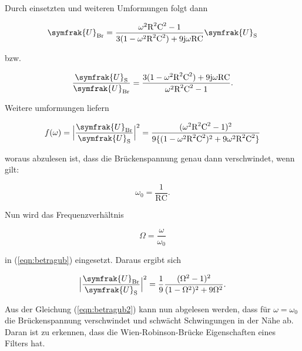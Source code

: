 \noindent
Durch einsetzten und weiteren Umformungen folgt dann

\begin{equation}
\symfrak{U}_\text{Br} = \frac{\omega^2 \text{R}^2 \text{C}^2 - 1}{3 (1 - \omega^2 \text{R}^2 \text{C}^2) + 9 \text{j} \omega \text{R} \text{C}} \symfrak{U}_\text{S}
\end{equation}

\noindent
bzw.

\begin{equation}
\frac{\symfrak{U}_\text{S}}{\symfrak{U}_\text{Br}} = \frac{3 (1 - \omega^2 \text{R}^2 \text{C}^2) + 9 \text{j} \omega \text{R} \text{C}}{\omega^2 \text{R}^2 \text{C}^2 - 1}.
\end{equation}

\noindent 
Weitere umformungen liefern

\begin{equation}
f(\omega) = \Bigl| \frac{\symfrak{U}_\text{Br}}{\symfrak{U}_\text{S}} \Bigr|^2 = \frac{(\omega^2 \text{R}^2 \text{C}^2 - 1)^2}{9 \{(1 - \omega^2 \text{R}^2 \text{C}^2)^2 + 9  \omega^2 \text{R}^2 \text{C}^2\}}
\label{eqn:betragub}
\end{equation}

\noindent
woraus abzulesen ist, dass die Brückenspannung genau dann verschwindet, wenn gilt:

\begin{equation}
\omega_0 = \frac{1}{\text{R} \text{C}} .
\label{eqn:omega0}
\end{equation}

\noindent 
Nun wird das Frequenzverhältnis

\begin{equation}
\Omega = \frac{\omega}{\omega_0} 
\label{eqn:omega}
\end{equation}

\noindent
in (\ref{eqn:betragub}) eingesetzt.
Daraus ergibt sich

\begin{equation}
\Bigl| \frac{\symfrak{U}_\text{Br}}{\symfrak{U}_\text{S}} \Bigr|^2 = \frac{1}{9} \frac{(\Omega^2 - 1)^2}{(1 - \Omega^2)^2 + 9 \Omega^2} .
\label{eqn:betragub2}
\end{equation}

\noindent
Aus der Gleichung (\ref{eqn:betragub2}) kann nun abgelesen werden, dass für $\omega=\omega_0$ die Brückenspannung verschwindet
und schwächt Schwingungen in der Nähe ab.
Daran ist zu erkennen, dass die Wien-Robinson-Brücke Eigenschaften eines Filters hat.

